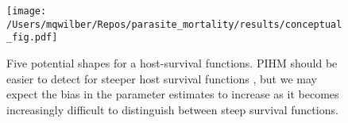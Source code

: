 \documentclass[12pt, a4paper]{article}
\begin{document}
\begin{figure}
    \texttt{[image: /Users/mqwilber/Repos/parasite\_mortality/results/conceptual\_fig.pdf]}

    \caption{Five potential shapes for a host-survival functions. PIHM should be easier to detect for steeper host survival functions \citep{Lanciani1989}, but we may expect the bias in the parameter estimates to increase as it becomes increasingly difficult to distinguish between steep survival functions.}
\end{figure}

\begin{figure}



\end{figure}
\end{document}
